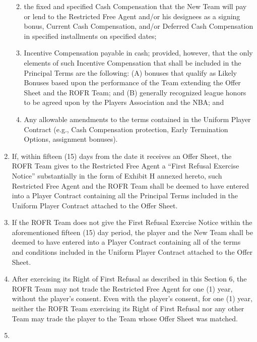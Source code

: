 \documentclass[
]{book}
\providecommand{\tightlist}{%
  \setlength{\itemsep}{0pt}\setlength{\parskip}{0pt}}
\begin{document}
\begin{enumerate}
  \begin{enumerate}
  \def\labelenumii{(\roman{enumii})}
  \tightlist
  \item
    the fixed and specified Cash Compensation that the New Team will pay or lend to the Restricted Free Agent and/or his designees as a signing bonus, Current Cash Compensation, and/or Deferred Cash Compensation in specified installments on specified dates;
  \item
    Incentive Compensation payable in cash; provided, however, that the only elements of such Incentive Compensation that shall be included in the Principal Terms are the following: (A) bonuses that qualify as Likely Bonuses based upon the performance of the Team extending the Offer Sheet and the ROFR Team; and (B) generally recognized league honors to be agreed upon by the Players Association and the NBA; and
  \item
    Any allowable amendments to the terms contained in the Uniform Player Contract (e.g., Cash Compensation protection, Early Termination Options, assignment bonuses).
  \end{enumerate}
\item
  If, within fifteen (15) days from the date it receives an Offer Sheet, the ROFR Team gives to the Restricted Free Agent a ``First Refusal Exercise Notice'' substantially in the form of Exhibit H annexed hereto, such Restricted Free Agent and the ROFR Team shall be deemed to have entered into a Player Contract containing all the Principal Terms included in the Uniform Player Contract attached to the Offer Sheet.
\item
  If the ROFR Team does not give the First Refusal Exercise Notice within the aforementioned fifteen (15) day period, the player and the New Team shall be deemed to have entered into a Player Contract containing all of the terms and conditions included in the Uniform Player Contract attached to the Offer Sheet.
\item
  After exercising its Right of First Refusal as described in this Section 6, the ROFR Team may not trade the Restricted Free Agent for one (1) year, without the player's consent. Even with the player's consent, for one (1) year, neither the ROFR Team exercising its Right of First Refusal nor any other Team may trade the player to the Team whose Offer Sheet was matched.
\item

\end{enumerate}
\end{document}
